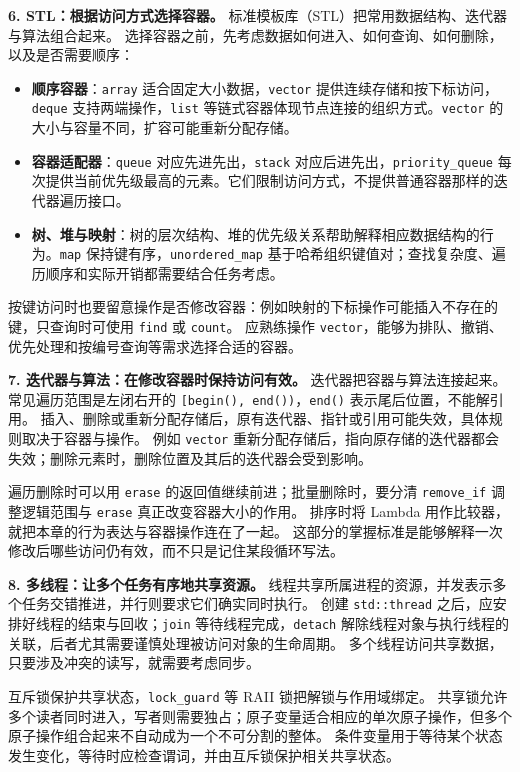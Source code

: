 \textbf{6. STL：根据访问方式选择容器。}
标准模板库（STL）把常用数据结构、迭代器与算法组合起来。
选择容器之前，先考虑数据如何进入、如何查询、如何删除，以及是否需要顺序：
\begin{itemize}
    \item \textbf{顺序容器}：\texttt{array} 适合固定大小数据，\texttt{vector} 提供连续存储和按下标访问，\texttt{deque} 支持两端操作，\texttt{list} 等链式容器体现节点连接的组织方式。\texttt{vector} 的大小与容量不同，扩容可能重新分配存储。
    \item \textbf{容器适配器}：\texttt{queue} 对应先进先出，\texttt{stack} 对应后进先出，\texttt{priority\_queue} 每次提供当前优先级最高的元素。它们限制访问方式，不提供普通容器那样的迭代器遍历接口。
    \item \textbf{树、堆与映射}：树的层次结构、堆的优先级关系帮助解释相应数据结构的行为。\texttt{map} 保持键有序，\texttt{unordered\_map} 基于哈希组织键值对；查找复杂度、遍历顺序和实际开销都需要结合任务考虑。
\end{itemize}
按键访问时也要留意操作是否修改容器：例如映射的下标操作可能插入不存在的键，只查询时可使用 \texttt{find} 或 \texttt{count}。
应熟练操作 \texttt{vector}，能够为排队、撤销、优先处理和按编号查询等需求选择合适的容器。

\textbf{7. 迭代器与算法：在修改容器时保持访问有效。}
迭代器把容器与算法连接起来。常见遍历范围是左闭右开的 \texttt{[begin(), end())}，\texttt{end()} 表示尾后位置，不能解引用。
插入、删除或重新分配存储后，原有迭代器、指针或引用可能失效，具体规则取决于容器与操作。
例如 \texttt{vector} 重新分配存储后，指向原存储的迭代器都会失效；删除元素时，删除位置及其后的迭代器会受到影响。

遍历删除时可以用 \texttt{erase} 的返回值继续前进；批量删除时，要分清 \texttt{remove\_if} 调整逻辑范围与 \texttt{erase} 真正改变容器大小的作用。
排序时将 Lambda 用作比较器，就把本章的行为表达与容器操作连在了一起。
这部分的掌握标准是能够解释一次修改后哪些访问仍有效，而不只是记住某段循环写法。

\textbf{8. 多线程：让多个任务有序地共享资源。}
线程共享所属进程的资源，并发表示多个任务交错推进，并行则要求它们确实同时执行。
创建 \texttt{std::thread} 之后，应安排好线程的结束与回收；\texttt{join} 等待线程完成，\texttt{detach} 解除线程对象与执行线程的关联，后者尤其需要谨慎处理被访问对象的生命周期。
多个线程访问共享数据，只要涉及冲突的读写，就需要考虑同步。

互斥锁保护共享状态，\texttt{lock\_guard} 等 RAII 锁把解锁与作用域绑定。
共享锁允许多个读者同时进入，写者则需要独占；原子变量适合相应的单次原子操作，但多个原子操作组合起来不自动成为一个不可分割的整体。
条件变量用于等待某个状态发生变化，等待时应检查谓词，并由互斥锁保护相关共享状态。

